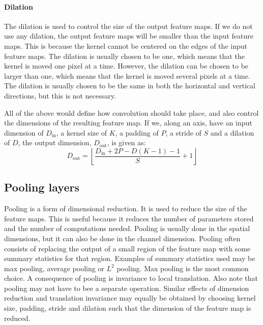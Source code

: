         \paragraph{Dilation}
            The dilation is used to control the size of the output feature maps. If we do not use any dilation, the output feature maps will be smaller than the input feature maps. This is because the kernel cannot be centered on the edges of the input feature maps. The dilation is usually chosen to be one, which means that the kernel is moved one pixel at a time. However, the dilation can be chosen to be larger than one, which means that the kernel is moved several pixels at a time. The dilation is usually chosen to be the same in both the horizontal and vertical directions, but this is not necessary.

        All of the above would define how convolution should take place, and also control the dimensions of the resulting feature map. If we, along an axis, have an input dimension of $D_\mathrm{in}$, a kernel size of $K$, a padding of $P$, a stride of $S$ and a dilation of $D$, the output dimension, $D_\mathrm{out}$, is given as:
        \begin{equation}
            D_\mathrm{out} = \left\lfloor {\frac{D_\mathrm{in} + 2P-D(K-1)-1}{S}+1} \right\rfloor
        \end{equation}
    \subsection{Pooling layers}
        Pooling is a form of dimensional reduction. It is used to reduce the size of the feature maps. This is useful because it reduces the number of parameters stored and the number of computations needed. Pooling is usually done in the spatial dimensions, but it can also be done in the channel dimension. Pooling often consists of replacing the output of a small region of the feature map with some summary statistics for that region. Examples of summary statistics used may be max pooling, average pooling or $L^2$ pooling. Max pooling is the most common choice. A consequence of pooling is invariance to local translation. Also note that pooling may not have to bee a separate operation. Similar effects of dimension reduction and translation invariance may equally be obtained by choosing kernel size, padding, stride and dilation such that the dimension of the feature map is reduced. 

